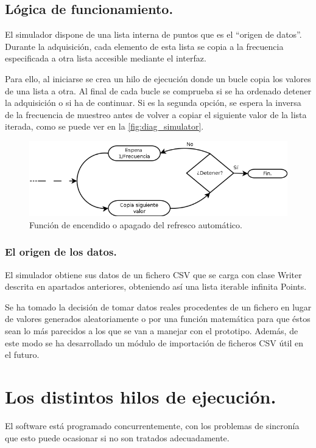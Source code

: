 	\subsection{Lógica de funcionamiento.}
		El simulador dispone de una lista interna de puntos que es el ``origen de datos''. Durante la adquisición, cada elemento de esta lista se copia a la frecuencia especificada a otra lista accesible mediante el interfaz.
		
		Para ello, al iniciarse se crea un hilo de ejecución donde un bucle copia los valores de una lista a otra. Al final de cada bucle se comprueba si se ha ordenado detener la adquisición o si ha de continuar. Si es la segunda opción, se espera la inversa de la frecuencia de muestreo antes de volver a copiar el siguiente valor de la lista iterada, como se puede ver en la  \autoref{fig:diag_simulator}.
\begin{figure}[H]
			\centering
		  	\includegraphics[width=1\textwidth]{img/diag_simulator.png}
  			\caption[Función de encendido o apagado del refresco automático de la gráfica.]{Función de encendido o apagado del refresco automático.}\label{fig:diag_simulator}
		\end{figure}
		
	\subsubsection{El origen de los datos.}
			El simulador obtiene sus datos de un fichero CSV que se carga con clase Writer descrita en apartados anteriores, obteniendo así una lista iterable infinita Points.
			
			Se ha tomado la decisión de tomar datos reales procedentes de un fichero en lugar de valores generados aleatoriamente o por una función matemática para que éstos sean lo más parecidos a los que se van a manejar con el prototipo. Además, de este modo se ha desarrollado un módulo de importación de ficheros CSV útil en el futuro.
		
	\section{Los distintos hilos de ejecución.}
	El software está programado concurrentemente, con los problemas de sincronía que  esto puede ocasionar si no son tratados adecuadamente. 

